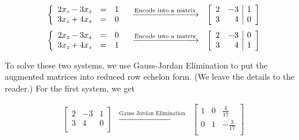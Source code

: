 \documentclass{ximera}
\begin{document}
\[ \begin{array}{ccc}

\left\{ \begin{array}{rcr} 2x_{\mbox{\tiny$1$}}-3x_{\mbox{\tiny$3$}} & = & 1 \\ 3x_{\mbox{\tiny$1$}}+4x_{\mbox{\tiny$3$}} & = & 0 \\ \end{array} \right.

&
\xrightarrow{\text{Encode into a matrix}}

&
\left[ \begin{array}{rr|r} 2 & -3 & 1 \\ 3 & 4 & 0 \\ \end{array} \right] \\ [13pt]


\left\{ \begin{array}{rcr} 2x_{\mbox{\tiny$2$}}-3x_{\mbox{\tiny$4$}} & = & 0 \\ 3x_{\mbox{\tiny$2$}}+4x_{\mbox{\tiny$4$}} & = & 1 \\ \end{array} \right. 

&
\xrightarrow{\text{Encode into a matrix}}

&

\left[ \begin{array}{rr|r} 2 & -3 & 0 \\ 3 & 4 & 1 \\ \end{array} \right] \\

\end{array} \]

To solve these two systems, we use Gauss-Jordan Elimination to put the augmented matrices into reduced row echelon form. (We leave the details to the reader.) For the first system, we get 

\[ \begin{array}{ccc}

\left[ \begin{array}{rr|r} 2 & -3 & 1 \\ 3 & 4 & 0 \\ \end{array} \right] 
&
\xrightarrow{\text{Gauss Jordan Elimination}}

&
\left[ \begin{array}{rr|r} 1 & 0 & \frac{4}{17} \\[3pt] 0 & 1 & -\frac{3}{17} \\ \end{array} \right] \\

\end{array}\]
\end{document}
